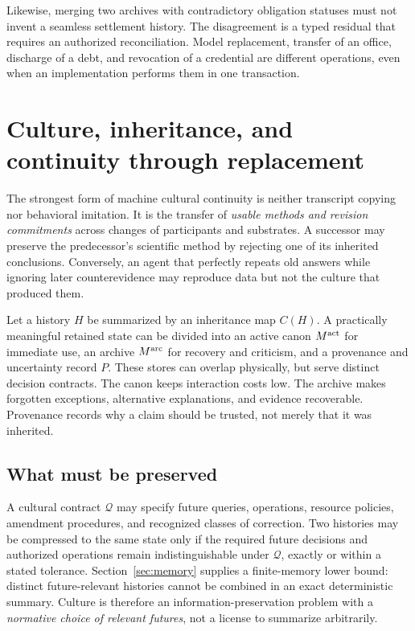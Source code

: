 \documentclass[11pt,letterpaper]{article}
\theoremstyle{plain}
\theoremstyle{definition}
\theoremstyle{remark}
\begin{document}
Likewise, merging two archives with contradictory obligation statuses must not invent a seamless settlement history. The disagreement is a typed residual that requires an authorized reconciliation. Model replacement, transfer of an office, discharge of a debt, and revocation of a credential are different operations, even when an implementation performs them in one transaction.

\section{Culture, inheritance, and continuity through replacement}\label{sec:culture}

The strongest form of machine cultural continuity is neither transcript copying nor behavioral imitation. It is the transfer of \emph{usable methods and revision commitments} across changes of participants and substrates. A successor may preserve the predecessor's scientific method by rejecting one of its inherited conclusions. Conversely, an agent that perfectly repeats old answers while ignoring later counterevidence may reproduce data but not the culture that produced them.

Let a history $H$ be summarized by an inheritance map $C(H)$. A practically meaningful retained state can be divided into an active canon $M^{\rm act}$ for immediate use, an archive $M^{\rm arc}$ for recovery and criticism, and a provenance and uncertainty record $P$. These stores can overlap physically, but serve distinct decision contracts. The canon keeps interaction costs low. The archive makes forgotten exceptions, alternative explanations, and evidence recoverable. Provenance records why a claim should be trusted, not merely that it was inherited.

\subsection{What must be preserved}

A cultural contract $\mathcal Q$ may specify future queries, operations, resource policies, amendment procedures, and recognized classes of correction. Two histories may be compressed to the same state only if the required future decisions and authorized operations remain indistinguishable under $\mathcal Q$, exactly or within a stated tolerance. Section~\ref{sec:memory} supplies a finite-memory lower bound: distinct future-relevant histories cannot be combined in an exact deterministic summary. Culture is therefore an information-preservation problem with a \emph{normative choice of relevant futures}, not a license to summarize arbitrarily.
\end{document}
